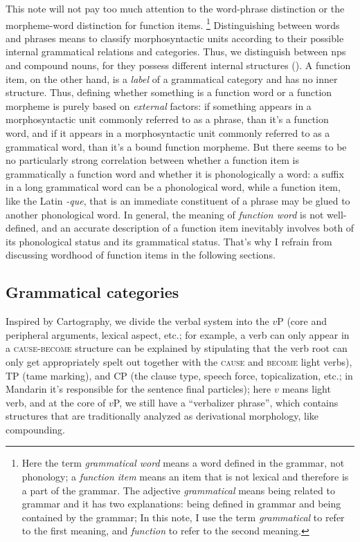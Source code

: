 \documentclass[UTF8, a4paper, oneside, scheme=plain, 12pt]{ctexrep}
\newcommand*{\term}[1]{\emph{#1}}
\newcommand{\form}[1]{\emph{#1}}
\newcommand*{\category}[1]{\textsc{#1}}
\begin{document}
{This note will not pay too much attention 
to the word-phrase distinction or the morpheme-word distinction
for function items.%
\footnote{
    Here the term \term{grammatical word} 
    means a word defined in the grammar, not phonology;
    a \term{function item} means an item that is not lexical
    and therefore is a part of the grammar. 
    The adjective \term{grammatical} means being related to grammar
    and it has two explanations:
    being defined in grammar and being contained by the grammar; 
    In this note, I use the term \term{grammatical} to refer to the first meaning, 
    and \term{function} to refer to the second meaning.
} 
Distinguishing between words and phrases 
means to classify morphosyntactic units 
according to their possible internal
grammatical relations and categories.
Thus, we distinguish between \acs{np}s and compound nouns, 
for they possess different internal structures 
().
A function item, on the other hand, is a \emph{label} of a grammatical category
and has no inner structure.
Thus, defining whether something is a function word or a function morpheme
is purely based on \emph{external} factors:
if something appears in a morphosyntactic unit commonly referred to as a phrase, 
than it's a function word, 
and if it appears in a morphosyntactic unit commonly referred to as a grammatical word, 
than it's a bound function morpheme.
But there seems to be no particularly strong correlation 
between whether a function item is grammatically a function word
and whether it is phonologically a word: 
a suffix in a long grammatical word can be a phonological word, 
while a function item, like the Latin \form{-que}, that is an immediate constituent of a phrase 
may be glued to another phonological word. 
In general, the meaning of \term{function word} is not well-defined, 
and an accurate description of a function item 
inevitably involves both of its phonological status and its grammatical status.
That's why I refrain from discussing wordhood of function items in the following sections.

\subsection{Grammatical categories}

Inspired by Cartography, 
we divide the verbal system into the $v$P 
(core and peripheral arguments, lexical aspect, etc.;
for example, a verb can only appear in a \category{cause-become} structure 
can be explained by stipulating that 
the verb root can only get appropriately spelt out
together with the \category{cause} and \category{become} light verbs), 
TP (\ac{tame} marking), 
and CP (the clause type, speech force, topicalization, etc.; 
in Mandarin it's responsible for the sentence final particles); 
here $v$ means light verb, 
and at the core of $v$P, 
we still have a ``verbalizer phrase'', 
which contains structures that are traditionally analyzed 
as derivational morphology, 
like compounding.

}
\end{document}
